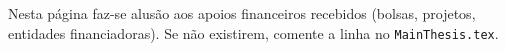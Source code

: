 \begin{apoios}
Nesta página faz-se alusão aos apoios financeiros recebidos (bolsas, projetos,
entidades financiadoras). Se não existirem, comente a linha
\verb|| no \texttt{MainThesis.tex}.
\end{apoios}
